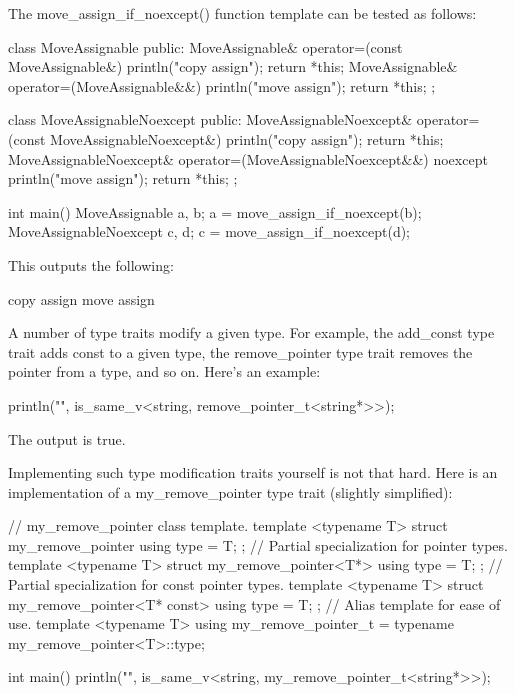 The move\_assign\_if\_noexcept() function template can be tested as follows:

\begin{cpp}
class MoveAssignable
{
    public:
        MoveAssignable& operator=(const MoveAssignable&) {
            println("copy assign"); return *this; }
        MoveAssignable& operator=(MoveAssignable&&) {
            println("move assign"); return *this; }
};

class MoveAssignableNoexcept
{
    public:
        MoveAssignableNoexcept& operator=(const MoveAssignableNoexcept&) {
            println("copy assign"); return *this; }
        MoveAssignableNoexcept& operator=(MoveAssignableNoexcept&&) noexcept {
            println("move assign"); return *this; }
};

int main()
{
    MoveAssignable a, b;
    a = move_assign_if_noexcept(b);
    MoveAssignableNoexcept c, d;
    c = move_assign_if_noexcept(d);
}
\end{cpp}

This outputs the following:

\begin{shell}
copy assign
move assign
\end{shell}


A number of type traits modify a given type. For example, the add\_const type trait adds const to a given type, the remove\_pointer type trait removes the pointer from a type, and so on. Here’s an example:

\begin{cpp}
println("{}", is_same_v<string, remove_pointer_t<string*>>);
\end{cpp}

The output is true.

Implementing such type modification traits yourself is not that hard. Here is an implementation of a my\_remove\_pointer type trait (slightly simplified):

\begin{cpp}
// my_remove_pointer class template.
template <typename T> struct my_remove_pointer { using type = T; };
// Partial specialization for pointer types.
template <typename T> struct my_remove_pointer<T*> { using type = T; };
// Partial specialization for const pointer types.
template <typename T> struct my_remove_pointer<T* const> { using type = T; };
// Alias template for ease of use.
template <typename T>
using my_remove_pointer_t = typename my_remove_pointer<T>::type;

int main()
{
    println("{}", is_same_v<string, my_remove_pointer_t<string*>>);
}
\end{cpp}

